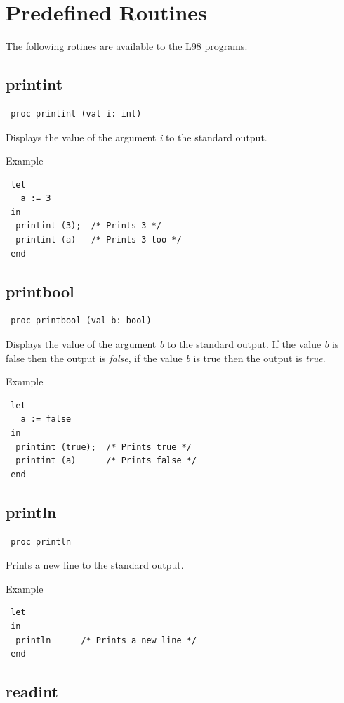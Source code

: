 \documentclass[a4paper, 11pt]{report}
\newcommand{\subarg}[1]{\textsl{#1}}
\newcommand{\valconst}[1]{\textsl{#1}}
\begin{document}
\section{Predefined Routines}
\label{sct:routines}
The following rotines are available to the L98 programs.

\subsection{printint}

\begin{verbatim}
 proc printint (val i: int)
\end{verbatim}
Displays the value of the argument \subarg{i} to the standard output.

Example
\begin{lstlisting}
 let
   a := 3
 in
  printint (3);  /* Prints 3 */
  printint (a)   /* Prints 3 too */
 end
\end{lstlisting}


\subsection{printbool}

\begin{lstlisting}
 proc printbool (val b: bool)
\end{lstlisting}
Displays the value of the argument \subarg{b} to the standard output.
If the value \subarg{b} is false then the output is \valconst{false},
if the value \subarg{b} is true then the output is \valconst{true}.

Example
\begin{lstlisting}
 let
   a := false
 in
  printint (true);  /* Prints true */
  printint (a)      /* Prints false */
 end
\end{lstlisting}


\subsection{println}

\begin{lstlisting}
 proc println
\end{lstlisting}
Prints a new line to the standard output.

Example
\begin{lstlisting}
 let
 in
  println      /* Prints a new line */
 end
\end{lstlisting}


\subsection{readint}
\end{document}
